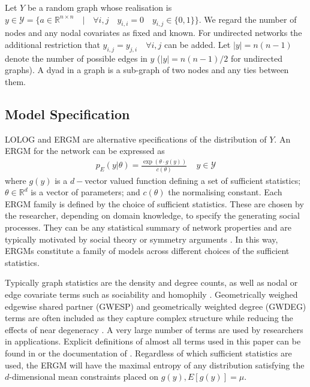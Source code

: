\documentclass[
]{statsoc}
\begin{document}
Let \(Y\) be a random graph whose realisation is
\(y \in \mathscr{Y} = \lbrace a \in \mathbb{R}^{n \times n} \quad \vert \quad \forall i,j \quad y_{i,i} = 0 \quad y_{i,j} \in \lbrace 0,1 \rbrace\rbrace\).
We regard the number of nodes and any nodal covariates as fixed and
known. For undirected networks the additional restriction that
\(y_{i,j} = y_{j,i} \quad\forall i,j\) can be added. Let \(|y|=n(n-1)\)
denote the number of possible edges in \(y\) (\(|y|=n(n-1)/2\) for
undirected graphs). A dyad in a graph is a sub-graph of two nodes and
any ties between them.

\subsection{Model Specification}

LOLOG and ERGM are alternative specifications of the distribution of
\(Y\). An ERGM for the network can be expressed as
\begin{align}\label{eq:ERGM_spec}
p_{E}(y\vert \theta) = \frac{\exp(\theta\cdot g(y))}{c({\theta})}~~~~~ y\in \mathscr{Y}
\end{align} \noindent where \(g(y)\) is a \(d-\)vector valued function
defining a set of sufficient statistics; \(\theta \in \mathds{R}^{d}\)
is a vector of parameters; and \(c(\theta)\) the normalising constant.
Each ERGM family is defined by the choice of sufficient statistics.
These are chosen by the researcher, depending on domain knowledge, to
specify the generating social processes. They can be any statistical
summary of network properties and are typically motivated by social
theory \citep{goodkittsmorris09} or symmetry arguments \citep{str86}. In
this way, ERGMs constitute a family of models across different choices
of the sufficient statistics.

Typically graph statistics are the density and degree counts, as well as
nodal or edge covariate terms such as sociability and homophily
\citep{ergmtermsjss}. Geometrically weighed edgewise shared partner
(GWESP) and geometrically weighted degree (GWDEG) terms are often
included \citep{snijders2006} as they capture complex structure while
reducing the effects of near degeneracy \citep{Handcock2003}. A very
large number of terms are used by researchers in applications. Explicit
definitions of almost all terms used in this paper can be found in
\cite{ergmtermsjss} or the documentation of \cite{ergm_3_9_4}.
Regardless of which sufficient statistics are used, the ERGM will have
the maximal entropy of any distribution satisfying the \(d\)-dimensional
mean constraints placed on \(g(y), E[g(y)]=\mu\).
\end{document}
